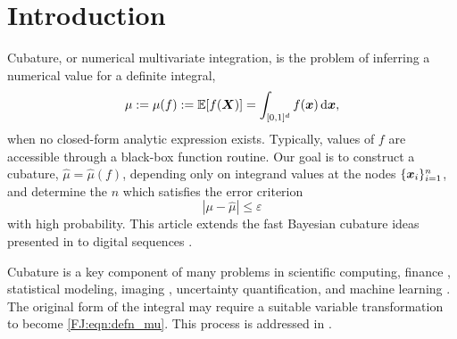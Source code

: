 \documentclass[graybox,footinfo]{svmult}
\newcommand{\abs}[1]{\left\lvert #1 \right\rvert} %
\newcommand{\JRNote}[1]{{\textcolor{green}{JR: #1}}}
\begin{document}





\section{Introduction}
\label{FJ:intro}

Cubature, or numerical multivariate integration, is the problem of inferring a numerical value for a definite integral, 
\begin{equation}
\label{FJ:eqn:defn_mu}
\mu:= \mu(f) := \bbE[f(\boldsymbol{X})] = \int_{[0,1]^d} f(\bsx)\, \textup{d}\bsx, 
\end{equation}
when no closed-form analytic expression exists. Typically, values of $f$ are accessible through a black-box function routine. Our goal is to construct a cubature, $\widehat{\mu} = \widehat{\mu}(f)$, depending only on integrand values at the nodes $\{{\boldsymbol{x}}_i\}_{i=1}^n$, and determine the $n$ which satisfies the error criterion
\begin{equation}
\label{FJ:eqn:err_crit} 
\abs{\mu - \widehat{\mu}} \leq \varepsilon
\end{equation}
with high probability. This article extends the fast Bayesian cubature ideas presented in \cite{RatHic19a} to digital sequences \cite{DicPil10a}.


Cubature is a key component of many problems in scientific computing, finance \cite{Gla03}, statistical modeling, imaging \cite{Keller2013}, uncertainty quantification, and machine learning \cite{Goodfellow-et-al-2016}. 
The original form of the integral may require a suitable variable transformation to become \eqref{FJ:eqn:defn_mu}. This process is addressed in \cite{BecHae92b, Sid08a, Sid93, Lau96a, CriEtal07}. 
\end{document}
